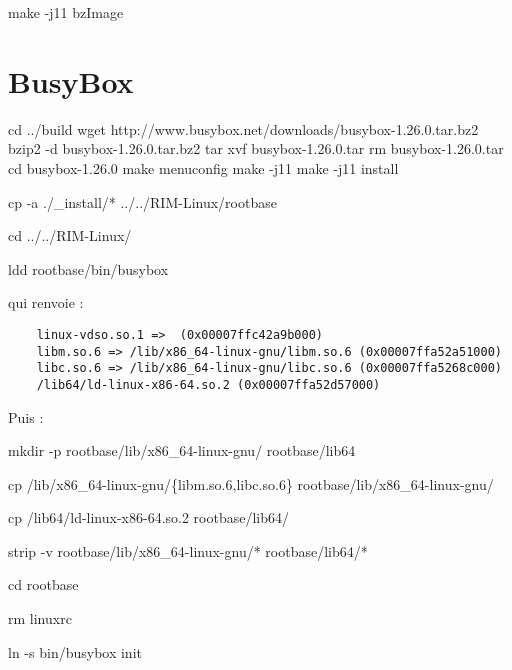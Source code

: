\documentclass[]{article}
\newenvironment{Shaded}{}{}
\newcommand{\DataTypeTok}[1]{\textcolor[rgb]{0.56,0.13,0.00}{{#1}}}
\newcommand{\FunctionTok}[1]{\textcolor[rgb]{0.02,0.16,0.49}{{#1}}}
\newcommand{\BuiltInTok}[1]{{#1}}
\newcommand{\NormalTok}[1]{{#1}}
\begin{document}
\begin{Shaded}
\begin{Highlighting}[]
\FunctionTok{make} \NormalTok{-j11 bzImage}
\end{Highlighting}
\end{Shaded}

\section{BusyBox}\label{busybox}

\begin{Shaded}
\begin{Highlighting}[]
\BuiltInTok{cd} \NormalTok{../build}
\FunctionTok{wget} \NormalTok{http://www.busybox.net/downloads/busybox-1.26.0.tar.bz2}
\FunctionTok{bzip2} \NormalTok{-d busybox-1.26.0.tar.bz2}
\FunctionTok{tar} \NormalTok{xvf busybox-1.26.0.tar}
\FunctionTok{rm} \NormalTok{busybox-1.26.0.tar}
\BuiltInTok{cd} \NormalTok{busybox-1.26.0}
\FunctionTok{make} \NormalTok{menuconfig}
\FunctionTok{make} \NormalTok{-j11}
\FunctionTok{make} \NormalTok{-j11 install}

\FunctionTok{cp} \NormalTok{-a ./_install/* ../../RIM-Linux/rootbase}

\BuiltInTok{cd} \NormalTok{../../RIM-Linux/}


\FunctionTok{ldd} \NormalTok{rootbase/bin/busybox}
\end{Highlighting}
\end{Shaded}

qui renvoie :

\begin{verbatim}
    linux-vdso.so.1 =>  (0x00007ffc42a9b000)
    libm.so.6 => /lib/x86_64-linux-gnu/libm.so.6 (0x00007ffa52a51000)
    libc.so.6 => /lib/x86_64-linux-gnu/libc.so.6 (0x00007ffa5268c000)
    /lib64/ld-linux-x86-64.so.2 (0x00007ffa52d57000)
\end{verbatim}

Puis :

\begin{Shaded}
\begin{Highlighting}[]
\FunctionTok{mkdir} \NormalTok{-p rootbase/lib/x86_64-linux-gnu/ rootbase/lib64}

\FunctionTok{cp} \NormalTok{/lib/x86_64-linux-gnu/}\DataTypeTok{\{libm.so.6,libc.so.6\}} \NormalTok{rootbase/lib/x86_64-linux-gnu/}

\FunctionTok{cp} \NormalTok{/lib64/ld-linux-x86-64.so.2 rootbase/lib64/}


\FunctionTok{strip} \NormalTok{-v rootbase/lib/x86_64-linux-gnu/* rootbase/lib64/*}

\BuiltInTok{cd} \NormalTok{rootbase}

\FunctionTok{rm} \NormalTok{linuxrc}

\FunctionTok{ln} \NormalTok{-s bin/busybox init}
\end{Highlighting}
\end{Shaded}
\end{document}
